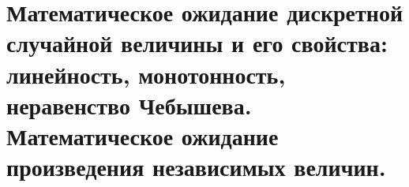 \section{Математическое ожидание дискретной случайной величины и его свойства: линейность, монотонность, неравенство Чебышева. Математическое ожидание произведения независимых величин.}